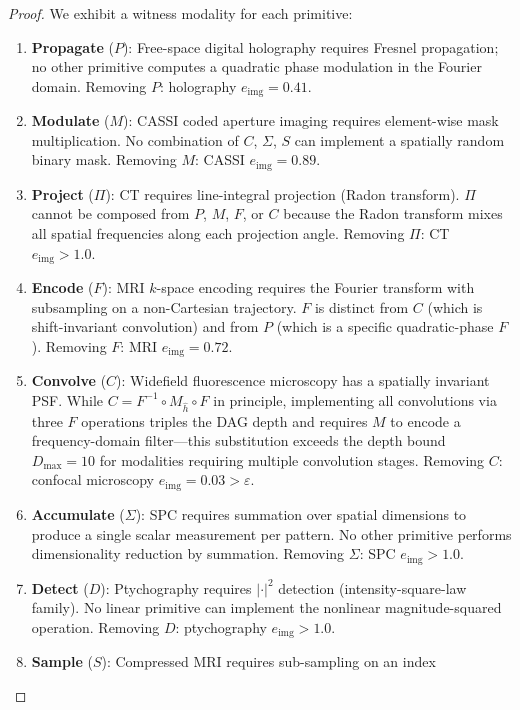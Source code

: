 \documentclass[11pt]{article}
\theoremstyle{definition}
\begin{document}
\begin{proof}
We exhibit a witness modality for each primitive:

\begin{enumerate}
  \item \textbf{Propagate} ($P$): Free-space digital holography requires Fresnel propagation;
    no other primitive computes a quadratic phase modulation in the Fourier domain.
    Removing $P$: holography $e_{\mathrm{img}} = 0.41$.
  \item \textbf{Modulate} ($M$): CASSI coded aperture imaging requires
    element-wise mask multiplication. No combination of $C$, $\Sigma$, $S$
    can implement a spatially random binary mask.
    Removing $M$: CASSI $e_{\mathrm{img}} = 0.89$.
  \item \textbf{Project} ($\Pi$): CT requires line-integral projection (Radon transform).
    $\Pi$ cannot be composed from $P$, $M$, $F$, or $C$ because the Radon
    transform mixes all spatial frequencies along each projection angle.
    Removing $\Pi$: CT $e_{\mathrm{img}} > 1.0$.
  \item \textbf{Encode} ($F$): MRI $k$-space encoding requires the Fourier transform
    with subsampling on a non-Cartesian trajectory.
    $F$ is distinct from $C$ (which is shift-invariant convolution)
    and from $P$ (which is a specific quadratic-phase $F$).
    Removing $F$: MRI $e_{\mathrm{img}} = 0.72$.
  \item \textbf{Convolve} ($C$): Widefield fluorescence microscopy has a
    spatially invariant PSF.  While $C = F^{-1} \circ M_{\hat{h}} \circ F$
    in principle, implementing all convolutions via three $F$ operations
    triples the DAG depth and requires $M$ to encode a frequency-domain
    filter---this substitution exceeds the depth bound $D_{\max} = 10$
    for modalities requiring multiple convolution stages.
    Removing $C$: confocal microscopy $e_{\mathrm{img}} = 0.03 > \varepsilon$.
  \item \textbf{Accumulate} ($\Sigma$): SPC requires summation over spatial
    dimensions to produce a single scalar measurement per pattern.
    No other primitive performs dimensionality reduction by summation.
    Removing $\Sigma$: SPC $e_{\mathrm{img}} > 1.0$.
  \item \textbf{Detect} ($D$): Ptychography requires $|{\cdot}|^2$ detection
    (intensity-square-law family).  No linear primitive can implement
    the nonlinear magnitude-squared operation.
    Removing $D$: ptychography $e_{\mathrm{img}} > 1.0$.
  \item \textbf{Sample} ($S$): Compressed MRI requires sub-sampling on an index

\end{enumerate}
\end{proof}
\end{document}
